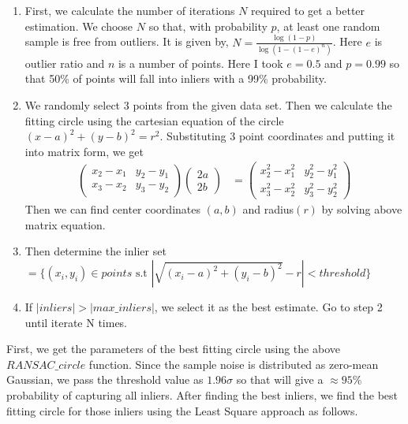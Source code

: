 \documentclass[a4paper]{article}
\begin{document}
\begin{enumerate}
  \itemsep0em 
  \item First, we calculate the number of iterations $N$ required to get a better estimation. We choose $N$ 
  so that, with probability $p$, at least one random sample is free from outliers.
  It is given by, $N=\frac{\log{(1-p)}}{\log{(1-(1-e)^n)}}$. Here $e$ is outlier
  ratio and $n$ is a number of points. Here I took $e=0.5$ and $p=0.99$ so 
  that 50\% of points will fall into inliers with a 99\% probability.
  \item We randomly select 3 points from the given data set. Then we calculate the fitting
   circle using the cartesian equation of the circle $(x-a)^2+(y-b)^2=r^2$. Substituting
    3 point coordinates and putting it into matrix form, we get
   \begin{align*}
     \begin{pmatrix}
       x_2-x_1 & y_2-y_1\\
       x_3-x_2 & y_3-y_2
     \end{pmatrix}
     \begin{pmatrix}
       2a\\
       2b
     \end{pmatrix}&=
     \begin{pmatrix}
      x_2^2-x_1^2 & y_2^2-y_1^2\\
      x_3^2-x_2^2 & y_3^2-y_2^2
    \end{pmatrix}
   \end{align*}
   Then we can find center coordinates $(a, b)$ and radius$(r)$ by solving above matrix equation.
   \item Then determine the inlier set 
   $=\{(x_i,y_i)\in points \text{ s.t }|\sqrt{(x_i-a)^2+(y_i-b)^2}-r|<threshold\}$
   \item If $|inliers|>|max\_inliers|$, we select it as the best estimate. Go to step 2
   until iterate N times.
  \end{enumerate}
First, we get the parameters of the best fitting circle using the above 
$RANSAC\_circle$ function. Since the sample noise is distributed as zero-mean
 Gaussian, we pass the threshold value as $1.96\sigma$ so that will give
  a $\approx95\%$ probability of capturing all inliers. After
   finding the best inliers, we find the best fitting circle for
    those inliers using the Least Square approach as follows.
\end{document}
